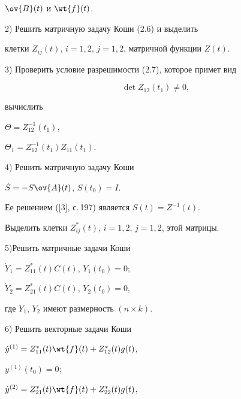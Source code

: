 $\ov {B}(t)$ и $\wt {f}(t)$.





\noindent


2) Решить матричную задачу Коши (2.6) и выделить


клетки $Z_{ij}(t)$, $i=1,2$, $j=1,2$, матричной функции $Z(t)$. 





\noindent


3) Проверить условие разрешимости (2.7), которое примет вид


\begin{equation}


\det Z_{12}(t_{1})\neq 0,


\end{equation}


вычислить


$\Theta=Z_{12}^{-1}(t_{1})$,


$\Theta_{1}=Z_{12}^{-1}(t_{1})Z_{11}(t_{1})$.





\noindent


4) Решить матричную задачу Коши


$\Dot {S}=-S\ov {A}(t)$, $S(t_{0})=I$.


Ее решением ([3], с.\,197) является $S(t)=Z^{-1}(t)$.


Выделить клетки $Z_{ij}^{\ast }(t)$, $i=1,2$, $j=1,2$, этой матрицы.





\noindent


5)Решить матричные задачи Коши


$\Dot {Y}_{1}=Z^{\ast }_{11}(t)C(t)$, $Y_{1}(t_{0})=0$;


$\Dot {Y}_{2}=Z^{\ast }_{21}(t)C(t)$, $Y_{2}(t_{0})=0$,


где $Y_{1}$, $Y_{2}$ имеют размерность $(n\times k)$.





\noindent


6) Решить векторные задачи Коши


$\Dot {y}^{(1)}=Z^{\ast }_{11}(t)\wt {f}(t)+Z^{\ast }_{12}(t)g(t)$,


$y^{(1)}(t_{0})=0$;


$\Dot {y}^{(2)}=Z^{\ast }_{21}(t)\wt {f}(t)+Z^{\ast }_{22}(t)g(t)$,



